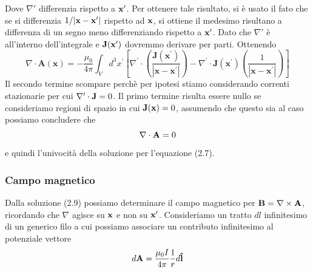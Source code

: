 Dove $\nabla'$ differenzia rispetto a $\bold{x}'$. Per ottenere tale risultato, si \`e usato il fato che se si differenzia $1/|\bold{x} - \bold{x}'|$ rispetto ad $\bold{x}$, si ottiene il medesimo risultano a differenza di un segno meno differenziando rispetto a $\bold{x}'$. Dato che $\nabla'$ \`e all'interno dell'integrale e $\bold{J}(\bold{x}')$ dovremmo derivare per parti. Ottenendo 
\begin{equation*}
\nabla \cdot \mathbf{A}(\mathbf{x})=-\frac{\mu_0}{4 \pi} \int_V d^3 x^{\prime}\left[\nabla^{\prime} \cdot\left(\frac{\mathbf{J}\left(\mathbf{x}^{\prime}\right)}{\left|\mathbf{x}-\mathbf{x}^{\prime}\right|}\right)-\nabla^{\prime} \cdot \mathbf{J}\left(\mathbf{x}^{\prime}\right)\left(\frac{1}{\left|\mathbf{x}-\mathbf{x}^{\prime}\right|}\right)\right]
\end{equation*}
Il secondo termine scompare perch\`e per ipotesi stiamo considerando correnti stazionarie per cui $\nabla' \cdot \bold{J} = 0$. Il primo termine risulta essere nullo se consideriamo regioni di spazio in cui $\bold{J}(\bold{x}) = 0$, assumendo che questo sia al caso possiamo concludere che 
\begin{equation*}
	\nabla \cdot \bold{A} = 0
\end{equation*}
e quindi l'univocit\`a della soluzione per l'equazione (2.7).

\subsubsection{Campo magnetico}

Dalla soluzione (2.9) possiamo determinare il campo magnetico per $\bold{B} = \nabla \times \bold{A}$, ricordando che $\nabla$ agisce su $\bold{x}$ e non su $\bold{x}'$. Consideriamo un tratto $dl$ infinitesimo di un generico filo a cui possiamo associare un contributo infinitesimo al potenziale vettore 
\begin{equation*}
	d\bold{A} = \frac{\mu_0I}{4\pi} \frac{1}{r} d\bold{\hat{l}}
\end{equation*}

